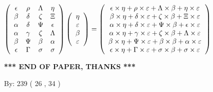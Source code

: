 \documentclass[12pt]{article}
\begin{document}
$  %
 \left( \begin{array}
 {
 c
 c
 c
 c
 }
 \epsilon & 
 \rho & 
 \Lambda & 
 \eta \\ 
 \beta & 
 \delta & 
                    \zeta & 
                    \Xi \\ 
 \alpha & 
 \delta & 
 \Psi & 
 \epsilon \\ 
 \alpha & 
 \gamma & 
                    \zeta & 
 \Lambda \\ 
 \beta & 
 \Psi & 
 \beta & 
 \alpha \\ 
 \epsilon & 
 \Gamma & 
 \sigma & 
 \sigma
 \end{array} \right)
 \left( \begin{array}
 {
 c
 }
 \eta \\ 
 \varepsilon \\ 
 \beta \\ 
 \varepsilon
 \end{array} \right)
=
 \left( \begin{array}
 {
 c
 }
  \epsilon \times  \eta +  \rho \times  \varepsilon +  \Lambda \times  \beta +  \eta \times  \varepsilon \\ 
  \beta \times  \eta +  \delta \times  \varepsilon +                     \zeta \times  \beta +                     \Xi \times  \varepsilon \\ 
  \alpha \times  \eta +  \delta \times  \varepsilon +  \Psi \times  \beta +  \epsilon \times  \varepsilon \\ 
  \alpha \times  \eta +  \gamma \times  \varepsilon +                     \zeta \times  \beta +  \Lambda \times  \varepsilon \\ 
  \beta \times  \eta +  \Psi \times  \varepsilon +  \beta \times  \beta +  \alpha \times  \varepsilon \\ 
  \epsilon \times  \eta +  \Gamma \times  \varepsilon +  \sigma \times  \beta +  \sigma \times  \varepsilon
 \end{array} \right)
$
 
 
 
   
   
 \vspace{0.2in}
 
   
   
   
   
\vspace{1.0in} 
{\textbf{\large{ *** END OF PAPER, THANKS *** }}} 
   
   
\hspace{1.0in} By: 
         239 (          26 ,           34 )
   
\end{document}
